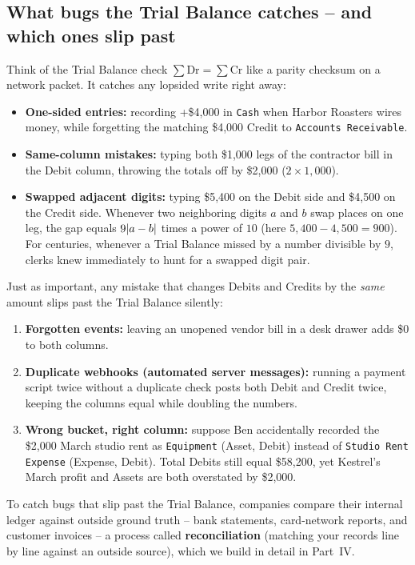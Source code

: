 \subsection*{What bugs the Trial Balance catches -- and which ones slip past}

Think of the Trial Balance check $\sum \text{Dr} = \sum \text{Cr}$ like a parity checksum on a network packet. It catches any lopsided write right away:
\begin{itemize}
  \item \textbf{One-sided entries:} recording +\$4,000 in \texttt{Cash} when Harbor Roasters wires money, while forgetting the matching \$4,000 Credit to \texttt{Accounts Receivable}.
  \item \textbf{Same-column mistakes:} typing both \$1,000 legs of the contractor bill in the Debit column, throwing the totals off by \$2,000 ($2 \times 1{,}000$).
  \item \textbf{Swapped adjacent digits:} typing \$5,400 on the Debit side and \$4,500 on the Credit side. Whenever two neighboring digits $a$ and $b$ swap places on one leg, the gap equals $9\lvert a - b\rvert$ times a power of $10$ (here $5{,}400 - 4{,}500 = 900$). For centuries, whenever a Trial Balance missed by a number divisible by $9$, clerks knew immediately to hunt for a swapped digit pair.
\end{itemize}

Just as important, any mistake that changes Debits and Credits by the \emph{same} amount slips past the Trial Balance silently:
\begin{enumerate}
  \item \textbf{Forgotten events:} leaving an unopened vendor bill in a desk drawer adds \$0 to both columns.
  \item \textbf{Duplicate webhooks (automated server messages):} running a payment script twice without a duplicate check posts both Debit and Credit twice, keeping the columns equal while doubling the numbers.
  \item \textbf{Wrong bucket, right column:} suppose Ben accidentally recorded the \$2,000 March studio rent as \texttt{Equipment} (Asset, Debit) instead of \texttt{Studio Rent Expense} (Expense, Debit). Total Debits still equal \$58,200, yet Kestrel's March profit and Assets are both overstated by \$2,000.
\end{enumerate}

To catch bugs that slip past the Trial Balance, companies compare their internal ledger against outside ground truth -- bank statements, card-network reports, and customer invoices -- a process called \textbf{reconciliation} (matching your records line by line against an outside source), which we build in detail in Part~IV.

